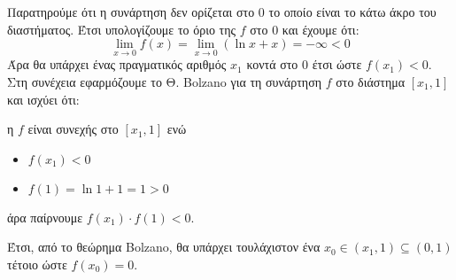 Παρατηρούμε ότι η συνάρτηση δεν ορίζεται στο $ 0 $ το οποίο είναι το κάτω άκρο του διαστήματος. Έτσι υπολογίζουμε το όριο της $ f $ στο $ 0 $ και έχουμε ότι:
\[ \lim_{x\to 0}{f(x)}=\lim_{x\to 0}{(\ln{x}+x)}=-\infty<0 \]
Άρα θα υπάρχει ένας πραγματικός αριθμός $ x_1 $ κοντά στο $ 0 $ έτσι ώστε $ f(x_1)<0 $. Στη συνέχεια εφαρμόζουμε το Θ. Bolzano για τη συνάρτηση $ f $ στο διάστημα $ [x_1,1] $ και ισχύει ότι:
\begin{rlist}
\item η $ f $ είναι συνεχής στο $ [x_1,1] $ ενώ
\item \begin{itemize}
\item $ f(x_1)<0 $
\item $ f(1)=\ln1+1=1>0 $
\end{itemize}
άρα παίρνουμε $ f(x_1)\cdot f(1)<0 $.
\end{rlist}
Έτσι, από το θεώρημα Bolzano, θα υπάρχει τουλάχιστον ένα $ x_0\in(x_1,1)\subseteq(0,1) $ τέτοιο ώστε $ f(x_0)=0 $.
